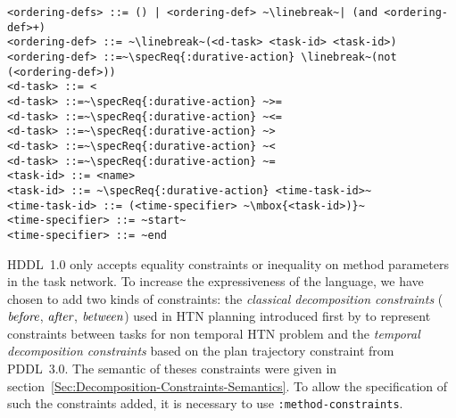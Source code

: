 \documentclass[letterpaper]{article} %
\newcommand{\before}{\text{\it before}}
\newcommand{\after}{\text{\it after}}
\renewcommand{\between}{\text{\it between}}
\begin{document}
\begin{lstlisting}[firstnumber=last, escapechar=~]
<ordering-defs> ::= () | <ordering-def> ~\linebreak~| (and <ordering-def>+)
<ordering-def> ::= ~\linebreak~(<d-task> <task-id> <task-id>)
<ordering-def> ::=~\specReq{:durative-action} \linebreak~(not (<ordering-def>))
<d-task> ::= <
<d-task> ::=~\specReq{:durative-action} ~>=
<d-task> ::=~\specReq{:durative-action} ~<=
<d-task> ::=~\specReq{:durative-action} ~>
<d-task> ::=~\specReq{:durative-action} ~<
<d-task> ::=~\specReq{:durative-action} ~=
<task-id> ::= <name>
<task-id> ::= ~\specReq{:durative-action} <time-task-id>~
<time-task-id> ::= (<time-specifier> ~\mbox{<task-id>)}~
<time-specifier> ::= ~start~
<time-specifier> ::= ~end
\end{lstlisting}

%
%
HDDL~1.0 only accepts equality constraints or inequality on method parameters in the task network. To increase the expressiveness of the language, we have chosen to add two kinds of constraints: the {\em classical decomposition constraints} ($\before$, $\after$, $\between$) used in HTN planning introduced first by \citep{erol94} to represent constraints between tasks for non temporal HTN problem and the {\em temporal decomposition constraints} based on the plan trajectory constraint from PDDL~3.0. The semantic of theses constraints were given in section~\ref{Sec:Decomposition-Constraints-Semantics}. To allow the specification of such the constraints added, it is necessary to use \verb+:method-constraints+.
\end{document}
